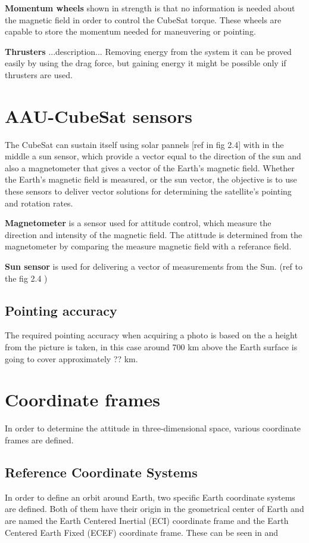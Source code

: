 \textbf{Momentum wheels} shown in  strength is that no information is needed about the magnetic field in order to control the CubeSat torque. These wheels are capable to store the momentum needed for maneuvering or pointing.

\textbf{Thrusters} ...description... Removing energy from the system it can be proved easily by using the drag force, but gaining energy it might be possible only if thrusters are used.
%
\section{AAU-CubeSat sensors}
The CubeSat can sustain itself using solar pannels [ref in fig 2.4] with in the middle a sun sensor, which provide a vector equal to the direction of the sun and also a magnetometer that gives a vector of the Earth's magnetic field. Whether the Earth’s magnetic field is measured, or the sun vector, the objective is to use these sensors to deliver vector solutions for determining the satellite’s pointing and rotation rates.

\textbf{Magnetometer} is a sensor used for attitude control, which measure the direction and intensity of the magnetic field. The atittude is determined from the magnetometer by comparing the measure magnetic field with a referance field.

\textbf{Sun sensor} is used for delivering a vector of measurements from the Sun. (ref to the fig 2.4 )
%
\subsection{Pointing accuracy}
The required pointing accuracy when acquiring a photo is based on the a height from the picture is taken, in this case around 700 km above the Earth surface is going to cover approximately ?? km. 

\section{Coordinate frames}
In order to determine the attitude in three-dimensional space, various coordinate frames are defined.
\subsection{Reference Coordinate Systems}
In order to define an orbit around Earth, two specific Earth coordinate systems are defined. Both of them have their origin in the geometrical center of Earth and are named the Earth Centered Inertial (ECI) coordinate frame and the Earth Centered Earth Fixed (ECEF) coordinate frame. These can be seen in  and 
